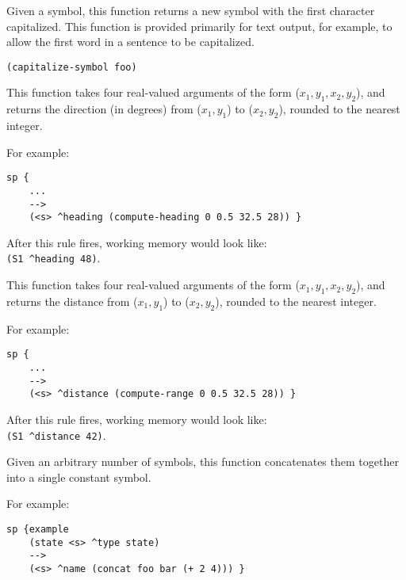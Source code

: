 \begin{description}
\item [\soarb{capitalize-symbol} --- ] Given a symbol, this function returns a
	new symbol with the first character capitalized. This function is
	provided primarily for text output, for example, to allow the first
        word in a sentence to be capitalized.


\begin{verbatim}
(capitalize-symbol foo)
\end{verbatim}


\item [\soarb{compute-heading} --- ] This function takes four real-valued arguments
of the form ($x_1, y_1, x_2, y_2$), and returns the direction (in degrees) from ($x_1, y_1$)
to ($x_2, y_2$), rounded to the nearest integer.

For example:

\begin{verbatim}
sp {
    ...
    -->
    (<s> ^heading (compute-heading 0 0.5 32.5 28)) }
\end{verbatim}

After this rule fires, working memory would look like: \\
\verb|(S1 ^heading 48)|.


\item [\soarb{compute-range} --- ] This function takes four real-valued arguments
of the form ($x_1, y_1, x_2, y_2$), and returns the distance from ($x_1, y_1$)
to ($x_2, y_2$), rounded to the nearest integer.

For example:

\begin{verbatim}
sp {
    ...
    -->
    (<s> ^distance (compute-range 0 0.5 32.5 28)) }
\end{verbatim}

After this rule fires, working memory would look like: \\
\verb|(S1 ^distance 42)|.


\item [\soarb{concat} --- ] Given an arbitrary number of symbols, this function
        concatenates them together into a single constant symbol. 

For example:

\begin{verbatim}
sp {example
    (state <s> ^type state)
    -->
    (<s> ^name (concat foo bar (+ 2 4))) }
\end{verbatim}


\end{description}
